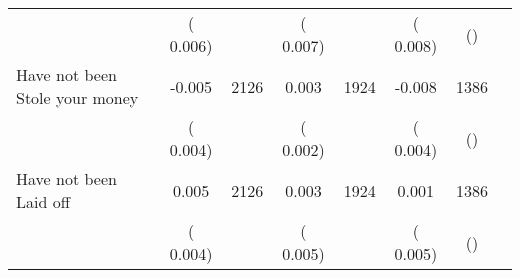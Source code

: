 \begin{tabular}{l*{6}{c}}
                       &       (       0.006)            &                               &       (       0.007)            &                               &       (       0.008)            &       () &                  \\
Have not been Stole your money        &             -0.005      &       2126       &              0.003      &       1924       &             -0.008      &       1386  &  &              \\
                       &       (       0.004)            &                               &       (       0.002)            &                               &       (       0.004)            &       () &                  \\
Have not been Laid off        &              0.005      &       2126       &              0.003      &       1924       &              0.001      &       1386  &  &              \\
                       &       (       0.004)            &                               &       (       0.005)            &                               &       (       0.005)            &       () &                  \\
\hline \end{tabular}